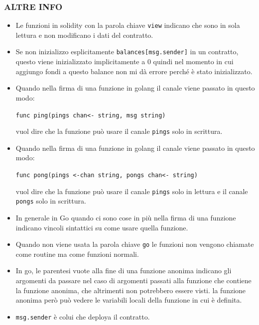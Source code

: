 \subsubsection{ALTRE INFO}
\begin{itemize}
    \item Le funzioni in solidity con la parola chiave \texttt{view} indicano che sono in sola lettura e non modificano i dati del contratto. 
    \item Se non inizializzo esplicitamente \texttt{balances[msg.sender]} in un contratto, questo viene inizializzato implicitamente a 0 quindi nel momento in cui aggiungo fondi a questo balance non mi dà errore perché è stato inizializzato.
    \item Quando nella firma di una funzione in golang il canale viene passato in questo modo:
    
    \texttt{func ping(pings chan<- string, msg string)}
    
    vuol dire che la funzione può usare il canale \texttt{pings} solo in scrittura.
    \item Quando nella firma di una funzione in golang il canale viene passato in questo modo:
    
    \texttt{func pong(pings <-chan string, pongs chan<- string)}
    
    vuol dire che la funzione può usare il canale \texttt{pings} solo in lettura e il canale \texttt{pongs} solo in scrittura.
    \item In generale in Go quando ci sono cose in più nella firma di una funzione indicano vincoli sintattici su come usare quella funzione.
    \item Quando non viene usata la parola chiave \texttt{go} le funzioni non vengono chiamate come routine ma come funzioni normali.
    \item In go, le parentesi vuote alla fine di una funzione anonima indicano gli argomenti da passare nel caso di argomenti passati alla funzione che contiene la funzione anonima, che altrimenti non potrebbero essere visti. la funzione anonima però può vedere le variabili locali della funzione in cui è definita.
    \item \texttt{msg.sender} è colui che deploya il contratto.
\end{itemize}

